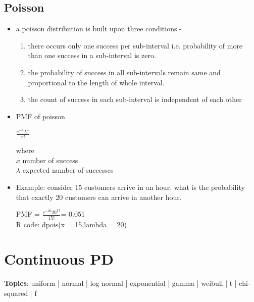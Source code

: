\documentclass{article}
\begin{document}
\subsection{Poisson}
\begin{itemize}
	\item a poisson distribution is built upon three conditions -
		\begin{enumerate}
		given an interval of real number constituting of an outcome of interest/success, if this interval is broken down into various sub-intervals 
			\item there occurs only one success per sub-interval i.e. probability of more than one success in a sub-interval is zero.
			\item the probability of success in all sub-intervals remain same and proportional to the length of whole interval.
			\item the count of success in each sub-interval is independent of each other
		\end{enumerate}
	\item PMF of poisson
		\begin{center}
			\mbox{\Large\( \frac{e^{-\lambda}\lambda^x}{x!} \)} 		
		\end{center}
	where\\
	$x$ number of success\\
	$\lambda$ expected number of successes
	
	\item Example: consider 15 customers arrive in an hour, what is the probability that exactly 20 customers can arrive in another hour.
	
	\begin{center}
			PMF = \mbox{\Large\( \frac{e^{-20}20^{15}}{15!} \)}= 0.051\\
			R code: dpois(x = 15,lambda = 20) 			
	\end{center}

	
\end{itemize}

\section{Continuous PD}
\textbf{Topics}: uniform | normal | log normal | exponential | gamma | weibull | t | chi-squared | f
\end{document}
